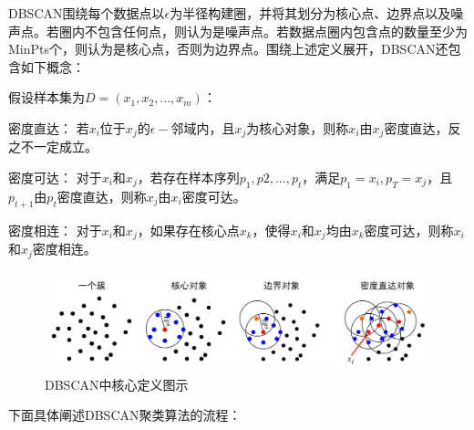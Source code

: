 DBSCAN围绕每个数据点以$\epsilon$为半径构建圈，并将其划分为核心点、边界点以及噪声点。若圈内不包含任何点，则认为是噪声点。若数据点圈内包含点的数量至少为MinPts个，则认为是核心点，否则为边界点。围绕上述定义展开，DBSCAN还包含如下概念：

假设样本集为$D=(x_1,x_2,...,x_m)$：
\begin{compactitem}
	\item 密度直达： 若$ x_i $位于$ x_j $的$ \epsilon- $邻域内，且$ x_j $为核心对象，则称$ x_i $由$ x_j $密度直达，反之不一定成立。
	\item 密度可达： 对于$ x_i $和$ x_j $，若存在样本序列$ p_1,p2,...,p_t $，满足$ p_1=x_i,p_T=x_j $，且$ p_{t+1} $由$ p_t $密度直达，则称$ x_j $由$ x_i $密度可达。
	\item 密度相连： 对于$ x_i $和$ x_j $，如果存在核心点$ x_k $，使得$ x_i $和$ x_j $均由$ x_k $密度可达，则称$ x_i $和$ x_j $密度相连。
\end{compactitem}

\begin{figure}[htbp] %
	\centering
	\includegraphics[scale=0.2]{img/dbscan-pre.png}
	\caption{DBSCAN中核心定义图示}
	\label{s4-dbscanpre}
\end{figure}

下面具体阐述DBSCAN聚类算法的流程：

